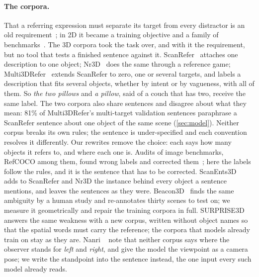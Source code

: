 \paragraph{The corpora.}
That a referring expression must separate its target from every distractor is an old requirement~\cite{dale1995gricean}; in 2D it became a training objective and a family of benchmarks~\cite{mao2016unambiguous,yu2016context}. The 3D corpora took the task over, and with it the requirement, but no tool that tests a finished sentence against it. ScanRefer~\cite{scanrefer} attaches one description to one object; Nr3D~\cite{referit3d} does the same through a reference game; Multi3DRefer~\cite{multi3drefer} extends ScanRefer to zero, one or several targets, and labels a description that fits several objects, whether by intent or by vagueness, with all of them. So \emph{the two pillows} and \emph{a pillow}, said of a couch that has two, receive the same label. The two corpora also share sentences and disagree about what they mean: 81\% of Multi3DRefer's multi-target validation sentences paraphrase a ScanRefer sentence about one object of the same scene (\cref{sec:model}). Neither corpus breaks its own rules; the sentence is under-specified and each convention resolves it differently. Our rewrites remove the choice: each says how many objects it refers to, and where each one is. Audits of image benchmarks, RefCOCO among them, found wrong labels and corrected them~\cite{northcutt2021pervasive,beyer2020imagenet,refl4}; here the labels follow the rules, and it is the sentence that has to be corrected. ScanEnts3D~\cite{scanents3d} adds to ScanRefer and Nr3D the instance behind every object a sentence mentions, and leaves the sentences as they were. Beacon3D~\cite{beacon3d} finds the same ambiguity by a human study and re-annotates thirty scenes to test on; we measure it geometrically and repair the training corpora in full. SURPRISE3D~\cite{surprise3d} answers the same weakness with a new corpus, written without object names so that the spatial words must carry the reference; the corpora that models already train on stay as they are. Nanri \etal~\cite{nanri2026viewpoint} note that neither corpus says where the observer stands for \emph{left} and \emph{right}, and give the model the viewpoint as a camera pose; we write the standpoint into the sentence instead, the one input every such model already reads.

